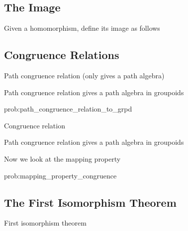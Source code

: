 \cite{lynge2019}


\subsection{The Image}

\begin{definition}
Given a homomorphism, define its image as follows
\end{definition}



\subsection{Congruence Relations}

\begin{definition}
Path congruence relation (only gives a path algebra)
\end{definition}

\begin{problem}
\label{prob:path_congruence_relation_to_grpd}
Path congruence relation gives a path algebra in groupoids
\end{problem}

\begin{construction}{prob:path_congruence_relation_to_grpd}

\end{construction}

\begin{definition}
Congruence relation
\end{definition}

\begin{problem}
\label{prob:congruence_relation_to_grpd}
Path congruence relation gives a path algebra in groupoids
\end{problem}

Now we look at the mapping property

\begin{problem}
\label{prob:mapping_property_congruence}

\end{problem}

\begin{construction}{prob:mapping_property_congruence}

\end{construction}

\subsection{The First Isomorphism Theorem}

\begin{theorem}
First isomorphism theorem
\end{theorem}
